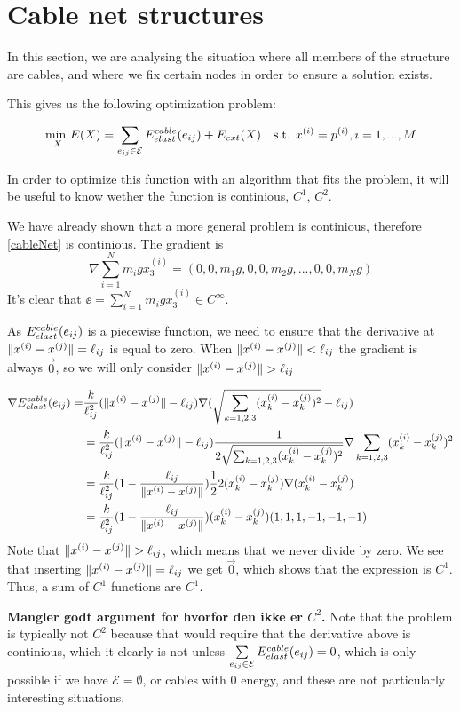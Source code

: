 \section{Cable net structures}
In this section, we are analysing the situation where all members of the structure are cables, and where we fix certain nodes in order to ensure a solution exists.

This gives us the following optimization problem:

\begin{equation}
    \underset{X}{\text{min }} E(X) = \sum\limits_{e_{ij} \in \mathcal{E}} E^{cable}_{elast}(e_{ij}) + E_{ext}(X) \quad \text{s.t. } x^{(i)} = p^{(i)}, i = 1,...,M
    \label{cableNet}
\end{equation}

In order to optimize this function with an algorithm that fits the problem, it will be useful to know wether the function is continious, $C^1$, $C^2$.

We have already shown that a more general problem is continious, therefore \eqref{cableNet} is continious. The gradient is 
\begin{equation}
    \nabla \sum_{i=1}^N m_i g x_3^{(i)}
    = (0,0,m_1 g, 0,0,m_2 g,...,0,0,m_N g)
    \label{gradient_external_force}
\end{equation}
It's clear that $\ee = \sum_{i=1}^N m_i g x_3^{(i)} \in C^{\infty}$. 

As $E^{cable}_{elast}(e_{ij})$ is a piecewise function, we need to ensure that the derivative at $\lVert x^{(i)} - x^{(j)}\rVert = \ell_{ij}$ is equal to zero. When $\lVert x^{(i)} - x^{(j)}\rVert < \ell_{ij}$ the gradient is always $\Vec{0}$, so we will only consider $\lVert x^{(i)} - x^{(j)}\rVert>\ell_{ij}$

\begin{align}
    \nabla E^{cable}_{elast}(e_{ij}) =  &\frac{k}{\ell_{ij}^2}(\lVert x^{(i)} - x^{(j)}\rVert - \ell_{ij}) \nabla (\sqrt{ \sum_{k= 1,2,3}(x_k^{(i)}-x_k^{(j)})^2}-\ell_{ij})\\&=\frac{k}{\ell_{ij}^2} (\lVert x^{(i)} - x^{(j)}\rVert - \ell_{ij}) \frac{1}{2\sqrt{\sum_{k=1,2,3}(x_k^{(i)}-x_k^{(j)})^2}}\nabla \sum_{k=1,2,3}(x_k^{(i)}-x_k^{(j)})^2\\ &= \frac{k}{\ell_{ij}^2} (1 - \frac{\ell_{ij}}{\lVert x^{(i)} - x^{(j)}\rVert}) \frac{1}{2} 2(x_k^{(i)} - x_k^{(j)}) \nabla (x_k^{(i)} - x_k^{(j)})\\ &= \frac{k}{\ell_{ij}^2} (1- \frac{\ell_{ij}}{\lVert x^{(i)} - x^{(j)}\rVert}) (x_k^{(i)} - x_k^{(j)}) ( 1, 1, 1,-1,-1,-1)
\end{align}
Note that $\lVert x^{(i)} - x^{(j)}\rVert>\ell_{ij}$, which means that we never divide by zero. We see that inserting $\lVert x^{(i)} - x^{(j)}\rVert = \ell_{ij}$ we get $\vec{0}$, which shows that the expression is $C^1$. Thus, a sum of $C^1$ functions are $C^1$.

\textbf{Mangler godt argument for hvorfor den ikke er $C^2$.}
Note that the problem is typically not $C^2$ because that would require that the derivative above is continious, which it clearly is not unless
$\sum\limits_{e_{ij} \in \mathcal{E}} E^{cable}_{elast}(e_{ij}) = 0$, which is only possible if we have $\mathcal{E} = \emptyset$, or cables with $0$ energy, and these are not particularly interesting situations.

